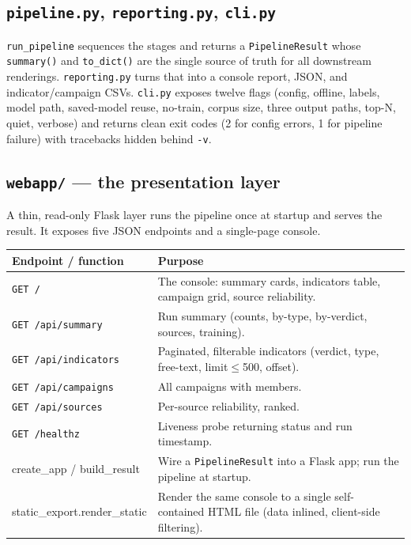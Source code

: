 \documentclass[11pt,a4paper]{article}
\newcommand{\code}[1]{\texttt{\small #1}}
\begin{document}
\subsection{\code{pipeline.py}, \code{reporting.py}, \code{cli.py}}
\code{run\_pipeline} sequences the stages and returns a \code{PipelineResult}
whose \code{summary()} and \code{to\_dict()} are the single source of truth for
all downstream renderings. \code{reporting.py} turns that into a console report,
JSON, and indicator/campaign CSVs. \code{cli.py} exposes twelve flags
(config, offline, labels, model path, saved-model reuse, no-train, corpus size,
three output paths, top-N, quiet, verbose) and returns clean exit codes (2 for
config errors, 1 for pipeline failure) with tracebacks hidden behind \code{-v}.

\subsection{\code{webapp/} --- the presentation layer}
A thin, read-only Flask layer runs the pipeline once at startup and serves the
result. It exposes five JSON endpoints and a single-page console.

\begin{center}
\begin{tabularx}{\linewidth}{@{}>{\ttfamily\small}p{4.6cm}X@{}}
\toprule
\rowcolor{paper}\textbf{Endpoint / function} & \textbf{Purpose} \\
\midrule
\texttt{GET /} & The console: summary cards, indicators table, campaign grid, source reliability. \\
\texttt{GET /api/summary} & Run summary (counts, by-type, by-verdict, sources, training). \\
\texttt{GET /api/indicators} & Paginated, filterable indicators (verdict, type, free-text, limit$\le$500, offset). \\
\texttt{GET /api/campaigns} & All campaigns with members. \\
\texttt{GET /api/sources} & Per-source reliability, ranked. \\
\texttt{GET /healthz} & Liveness probe returning status and run timestamp. \\
create\_app / build\_result & Wire a \code{PipelineResult} into a Flask app; run the pipeline at startup. \\
static\_export.render\_static & Render the same console to a single self-contained HTML file (data inlined, client-side filtering). \\
\bottomrule
\end{tabularx}
\end{center}
\end{document}
